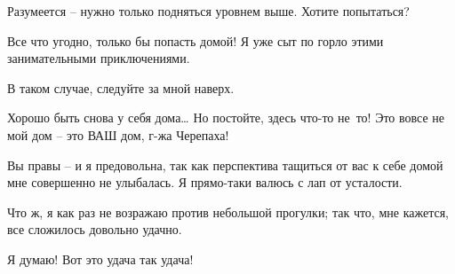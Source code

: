 \documentclass[../main.tex]{subfiles}
\begin{document}
\begin{Dialogue}
\begin{sublevel}
\begin{sublevel}
 Разумеется \--- нужно только подняться уровнем выше. Хотите попытаться?

 Все что угодно, только бы попасть домой! Я уже сыт по горло этими занимательными приключениями.

 В таком случае, следуйте за мной наверх.



\end{sublevel}

 Хорошо быть снова у себя дома\ldots{} Но постойте, здесь что-то не~то! Это вовсе не мой дом \--- это ВАШ дом, г-жа Черепаха!

 Вы правы \--- и я предовольна, так как перспектива тащиться от вас к себе домой мне совершенно не улыбалась. Я прямо-таки валюсь с лап от усталости.

 Что ж, я как раз не возражаю против небольшой прогулки; так что, мне кажется, все сложилось довольно удачно.

 Я думаю! Вот это удача так удача!


\end{sublevel}

\end{Dialogue}
\end{document}
